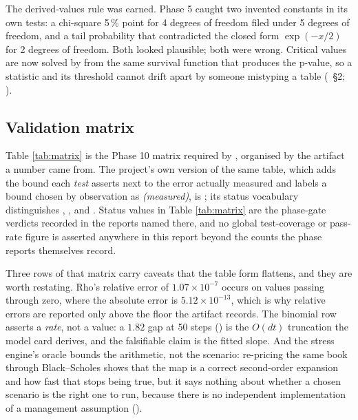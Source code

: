 \documentclass[11pt,a4paper]{article}
\begin{document}
The derived-values rule was earned. Phase 5 caught two invented constants in its own tests: a
chi-square 5\,\% point for 4 degrees of freedom filed under 5 degrees of freedom, and a tail
probability that contradicted the closed form $\exp(-x/2)$ for 2 degrees of freedom. Both
looked plausible; both were wrong. Critical values are now solved by 
from the same survival function that produces the p-value, so a statistic and its threshold
cannot drift apart by someone mistyping a table
(~\S2; ).

\subsection{Validation matrix}
Table \ref{tab:matrix} is the Phase 10 matrix required by , organised by
the artifact a number came from. The project's own version of the same table, which adds the
bound each \emph{test} asserts next to the error actually measured and labels a bound chosen by
observation as \emph{(measured)}, is
; its status vocabulary distinguishes ,
,  and . Status
values in Table \ref{tab:matrix} are the phase-gate verdicts recorded in the reports named there,
and no global test-coverage or pass-rate figure is asserted anywhere in this report beyond the
counts the phase reports themselves record.

Three rows of that matrix carry caveats that the table form flattens, and they are worth
restating. Rho's relative error of $1.07\times 10^{-7}$ occurs on values passing through zero,
where the absolute error is $5.12\times 10^{-13}$, which is why relative errors are reported only
above the floor the artifact records. The binomial row asserts a \emph{rate}, not a value: a
$1.82$ gap at 50 steps () is the
$O(dt)$ truncation the model card derives, and the falsifiable
claim is the fitted slope. And the stress engine's oracle bounds the arithmetic, not the scenario:
re-pricing the same book through Black--Scholes shows that the map is a correct second-order
expansion and how fast that stops being true, but it says nothing about whether a chosen
scenario is the right one to run, because there is no independent implementation of a management
assumption ().
\end{document}
